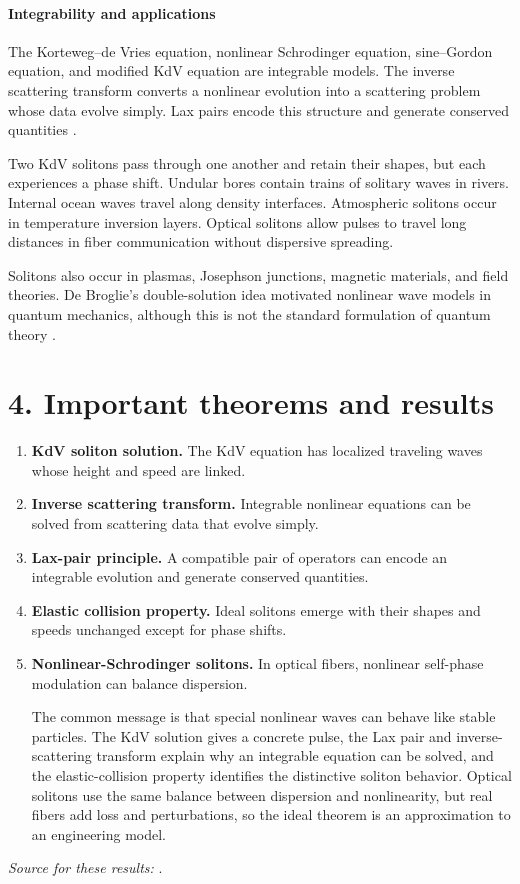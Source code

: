 \paragraph{Integrability and applications}
The Korteweg--de Vries equation, nonlinear Schrodinger equation, sine--Gordon equation, and modified KdV equation are integrable models. The inverse scattering transform converts a nonlinear evolution into a scattering problem whose data evolve simply. Lax pairs encode this structure and generate conserved quantities \cite{soliton_ref3}.

Two KdV solitons pass through one another and retain their shapes, but each experiences a phase shift. Undular bores contain trains of solitary waves in rivers. Internal ocean waves travel along density interfaces. Atmospheric solitons occur in temperature inversion layers. Optical solitons allow pulses to travel long distances in fiber communication without dispersive spreading.

Solitons also occur in plasmas, Josephson junctions, magnetic materials, and field theories. De Broglie's double-solution idea motivated nonlinear wave models in quantum mechanics, although this is not the standard formulation of quantum theory \cite{soliton_ref2}.

\section*{4. Important theorems and results}
\begin{enumerate}[leftmargin=*,itemsep=0.35em]
\item \textbf{KdV soliton solution.} The KdV equation has localized traveling waves whose height and speed are linked.

\item \textbf{Inverse scattering transform.} Integrable nonlinear equations can be solved from scattering data that evolve simply.

\item \textbf{Lax-pair principle.} A compatible pair of operators can encode an integrable evolution and generate conserved quantities.

\item \textbf{Elastic collision property.} Ideal solitons emerge with their shapes and speeds unchanged except for phase shifts.

\item \textbf{Nonlinear-Schrodinger solitons.} In optical fibers, nonlinear self-phase modulation can balance dispersion.

The common message is that special nonlinear waves can behave like stable particles. The KdV solution gives a concrete pulse, the Lax pair and inverse-scattering transform explain why an integrable equation can be solved, and the elastic-collision property identifies the distinctive soliton behavior. Optical solitons use the same balance between dispersion and nonlinearity, but real fibers add loss and perturbations, so the ideal theorem is an approximation to an engineering model.
\end{enumerate}
\noindent\emph{Source for these results:} \cite{soliton_ref1}.

